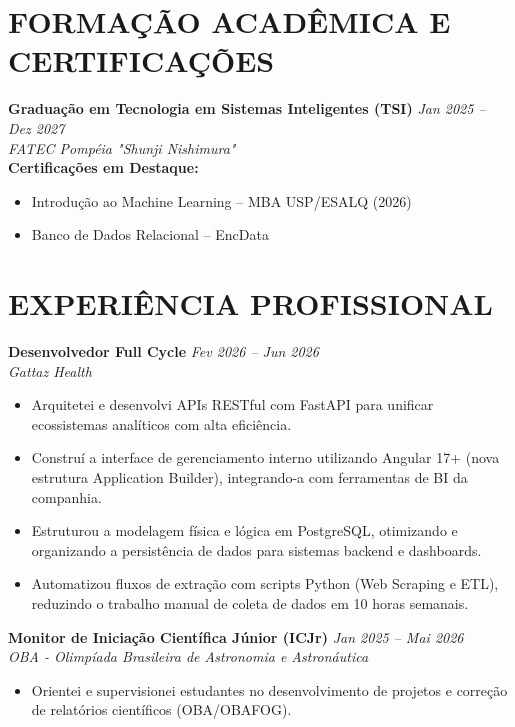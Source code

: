 \documentclass[11pt,a4paper]{article}
\begin{document}
\vspace{0.2cm}
\section*{FORMAÇÃO ACADÊMICA E CERTIFICAÇÕES}
\textbf{Graduação em Tecnologia em Sistemas Inteligentes (TSI)} \hfill \textit{Jan 2025 -- Dez 2027} \\
\textit{FATEC Pompéia "Shunji Nishimura"} \\
\vspace{0.1cm}
\textbf{Certificações em Destaque:}
\begin{itemize}
    \item Introdução ao Machine Learning -- MBA USP/ESALQ (2026)
    \item Banco de Dados Relacional -- EncData
\end{itemize}

\vspace{0.2cm}
\section*{EXPERIÊNCIA PROFISSIONAL}
\textbf{Desenvolvedor Full Cycle} \hfill \textit{Fev 2026 -- Jun 2026} \\
\textit{Gattaz Health} \\
\begin{itemize}
    \item Arquitetei e desenvolvi APIs RESTful com FastAPI para unificar ecossistemas analíticos com alta eficiência.
    \item Construí a interface de gerenciamento interno utilizando Angular 17+ (nova estrutura Application Builder), integrando-a com ferramentas de BI da companhia.
    \item Estruturou a modelagem física e lógica em PostgreSQL, otimizando e organizando a persistência de dados para sistemas backend e dashboards.
    \item Automatizou fluxos de extração com scripts Python (Web Scraping e ETL), reduzindo o trabalho manual de coleta de dados em 10 horas semanais.
\end{itemize}

\vspace{0.2cm}
\textbf{Monitor de Iniciação Científica Júnior (ICJr)} \hfill \textit{Jan 2025 -- Mai 2026} \\
\textit{OBA - Olimpíada Brasileira de Astronomia e Astronáutica} \\
\begin{itemize}
    \item Orientei e supervisionei estudantes no desenvolvimento de projetos e correção de relatórios científicos (OBA/OBAFOG).
\end{itemize}
\end{document}
